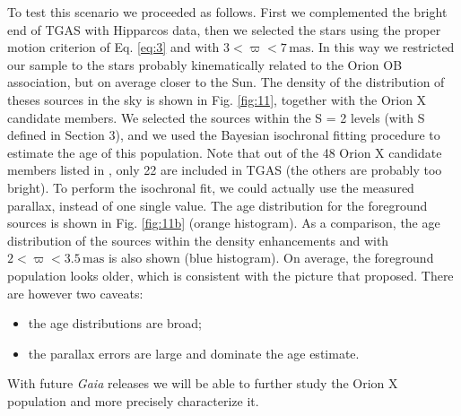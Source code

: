 \documentclass[twocolumn]{aa}
\begin{document}
To test this  scenario we proceeded as follows.
First we complemented the bright end of TGAS with Hipparcos data, then we selected the stars using the proper motion criterion of Eq. \eqref{eq:3} and with $3 <\varpi < 7 \,\mathrm{mas}$. In this way we restricted our sample to the  stars probably kinematically related to the Orion OB association, but on average closer to the Sun.  The density of the distribution of theses sources in the sky is shown in Fig. \ref{fig:11}, together with the Orion X candidate members. We selected the sources within the S = 2 levels (with S defined in Section 3), and we used the Bayesian isochronal fitting procedure to estimate the age of this population. 
Note that out of the 48 Orion X candidate members listed in \cite{Bouy2015}, only 22 are included in TGAS (the others are probably too bright).
To perform the isochronal fit, we could actually use the measured parallax, instead of one single value. The age distribution for the foreground sources is shown in Fig. \ref{fig:11b} (orange histogram). As a comparison, the age distribution of the sources within the density enhancements and with $2 < \varpi < 3.5 \, \mathrm{mas}$ is also shown (blue histogram). On average, the foreground population looks older, which is consistent with the picture that \cite{Bouy2015} proposed. There are however two caveats: 
\begin{itemize}
\item the age distributions are broad;
\item  the parallax errors are large and dominate the age estimate. 
\end{itemize}
With future \textit{Gaia} releases we will be able to further study the Orion X population and more precisely characterize it.
\end{document}
